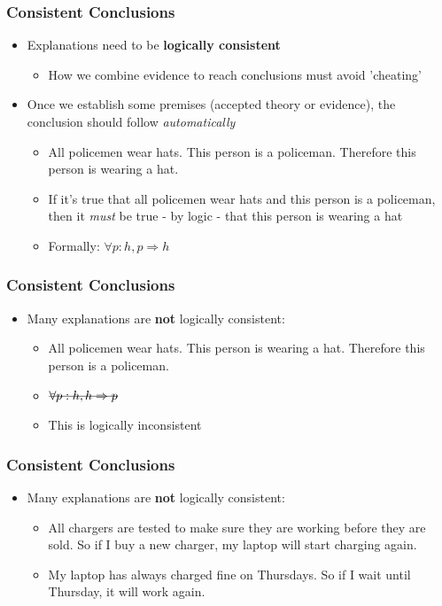 \documentclass[xcolor=x11names,compress]{beamer}\usepackage[]{graphicx}\usepackage[]{xcolor}
\renewcommand{\(}{\begin{columns}}
\renewcommand{\)}{\end{columns}}
\newcommand{\<}[1]{\begin{column}{#1}}
\renewcommand{\>}{\end{column}}
\begin{document}
\begin{frame}
\frametitle{Consistent Conclusions}
\begin{itemize}
\item Explanations need to be \textbf{logically consistent}
\pause
\begin{itemize}
\item How we combine evidence to reach conclusions must avoid 'cheating'
\end{itemize}
\pause
\item Once we establish some premises (accepted theory or evidence), the conclusion should follow \textit{automatically}
\begin{itemize}
\item All policemen wear hats. This person is a policeman. Therefore this person is wearing a hat.
\pause
\item If it's true that all policemen wear hats and this person is a policeman, then it \textit{must} be true - by logic - that this person is wearing a hat
\pause
\item Formally: $\forall p:  h, p \Rightarrow h$
\end{itemize}
\end{itemize}
\end{frame}

\begin{frame}
\frametitle{Consistent Conclusions}
\begin{itemize}
\item Many explanations are \textbf{not} logically consistent:
\pause
\begin{itemize}
\item All policemen wear hats. This person is wearing a hat. Therefore this person is a policeman.
\pause
\item $\text{\sout{\ensuremath{\forall p:  h, h \Rightarrow p}}}$
\item This is logically inconsistent
\end{itemize}
\end{itemize}
\end{frame}

\begin{frame}
\frametitle{Consistent Conclusions}
\begin{itemize}
\item Many explanations are \textbf{not} logically consistent:
\pause
\begin{itemize}
\item All chargers are tested to make sure they are working before they are sold. So if I buy a new charger, my laptop will start charging again.
\pause
\item My laptop has always charged fine on Thursdays. So if I wait until Thursday, it will work again. 
\end{itemize}
\end{itemize}
\end{frame}
\end{document}
